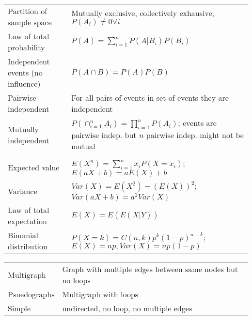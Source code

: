 \documentclass[a4paper,landscape]{article}
\begin{document}
\begin{multicols*}{2}
\begin{tabularx}{\columnwidth}{@{}lX@{}}
        Partition of sample space                  & Mutually exclusive, collectively exhausive, $P(A_i) \neq 0 \forall i$                                                \\
        Law of total probability                   & $P(A) = \sum_{i=1}^n P(A|B_i)P(B_i)$                                                                                 \\
        Independent events (no influence)          & $P(A \cap B) = P(A)P(B)$                                                                                             \\
        Pairwise independent                       & For all pairs of events in set of events they are independent                                                        \\
        Mutually independent                       & $P(\cap_{i=1}^n A_i) = \prod_{i=1}^n P(A_i)$; events are pairwise indep. but $n$ pairwise indep. might not be mutual \\
        \\
        Expected value                             & $E(X^n) = \sum_{i=1}^n x_i P(X=x_i)$; $E(aX+b) = aE(X)+b$                                                            \\
        Variance                                   & $Var(X) = E(X^2) - (E(X))^2$; $Var(aX+b) = a^2Var(X)$                                                                \\
        Law of total expectation                   & $E(X) = E(E(X|Y))$                                                                                                   \\
        Binomial distribution                      & $P(X=k) = C(n,k)p^k(1-p)^{n-k}$; $E(X) = np, Var(X) = np(1-p)$                                                       \\
    \end{tabularx}
    \begin{tabularx}{\columnwidth}{@{}lX@{}}
        Multigraph                       & Graph with multiple edges between same nodes but no loops                                                \\
        Psuedographs                     & Multigraph with loops                                                                                    \\
        Simple                           & undirected, no loop, no multiple edges                                                                   \\

\end{tabularx}
\end{multicols*}
\end{document}
